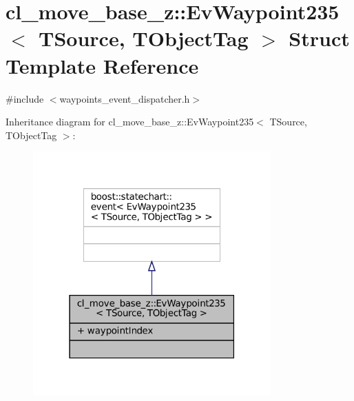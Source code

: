 \hypertarget{structcl__move__base__z_1_1EvWaypoint235}{}\section{cl\+\_\+move\+\_\+base\+\_\+z\+:\+:Ev\+Waypoint235$<$ T\+Source, T\+Object\+Tag $>$ Struct Template Reference}
\label{structcl__move__base__z_1_1EvWaypoint235}


{\ttfamily \#include $<$waypoints\+\_\+event\+\_\+dispatcher.\+h$>$}



Inheritance diagram for cl\+\_\+move\+\_\+base\+\_\+z\+:\+:Ev\+Waypoint235$<$ T\+Source, T\+Object\+Tag $>$\+:
\nopagebreak
\begin{figure}[H]
\begin{center}
\leavevmode
\includegraphics[width=259pt]{structcl__move__base__z_1_1EvWaypoint235__inherit__graph}
\end{center}
\end{figure}


